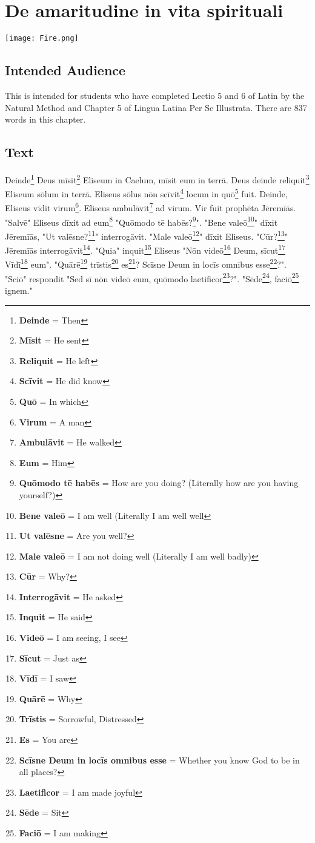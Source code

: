 \chapter{De amaritudine in vita spirituali}
\begin{center}
\texttt{[image: Fire.png]}
\end{center}

\section{Intended Audience}
This is intended for students who have completed Lectio 5 and 6 of Latin by the Natural Method and Chapter 5 of Lingua Latina Per Se Illustrata. There are 837 words in this chapter.

\section{Text}
Deinde\footnote{\textbf{Deinde} = Then} Deus mīsit\footnote{\textbf{Mīsit} = He sent} Eliseum in Caelum, mīsit eum in terrā. Deus deinde reliquit\footnote{\textbf{Reliquit} = He left} Eliseum sōlum in terrā. Eliseus sōlus nōn scīvit\footnote{\textbf{Scīvit} = He did know} locum in quō\footnote{\textbf{Quō} = In which} fuit. Deinde, Eliseus vīdit virum\footnote{\textbf{Virum} = A man}. Eliseus ambulāvit\footnote{\textbf{Ambulāvit} = He walked} ad virum. Vir fuit prophēta Jēremīās. "Salvē" Eliseus dīxit ad eum\footnote{\textbf{Eum} = Him} "Quōmodo tē habēs?\footnote{\textbf{Quōmodo tē habēs} = How are you doing? (Literally how are you having yourself?)}". "Bene valeō\footnote{\textbf{Bene valeō} = I am well (Literally I am well well}" dīxit Jēremīās, "Ut valēsne?\footnote{\textbf{Ut valēsne} = Are you well?}" interrogāvit. "Male valeō\footnote{\textbf{Male valeō} = I am not doing well (Literally I am well badly)}" dīxit Eliseus. "Cūr?\footnote{\textbf{Cūr} = Why?}" Jēremīās interrogāvit\footnote{\textbf{Interrogāvit} = He asked}. "Quia" inquit\footnote{\textbf{Inquit} = He said} Eliseus "Nōn videō\footnote{\textbf{Videō} = I am seeing, I see} Deum, sīcut\footnote{\textbf{Sīcut} = Just as} Vīdī\footnote{\textbf{Vīdī} = I saw} eum". "Quārē\footnote{\textbf{Quārē} = Why} trīstis\footnote{\textbf{Trīstis} = Sorrowful, Distressed} es\footnote{\textbf{Es} = You are}? Scīsne Deum in locīs omnibus esse\footnote{\textbf{Scīsne Deum in locīs omnibus esse} = Whether you know God to be in all places?}?". "Sciō" respondit "Sed sī nōn videō eum, quōmodo laetificor\footnote{\textbf{Laetificor} = I am made joyful}?". "Sēde\footnote{\textbf{Sēde} = Sit}, faciō\footnote{\textbf{Faciō} = I am making} ignem." \par 
